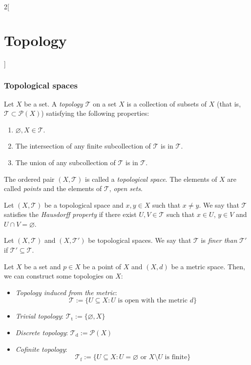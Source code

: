 \documentclass[../../../main.tex]{subfiles}
\begin{document}
\begin{multicols}{2}[\section{Topology}]
  \subsubsection*{Topological spaces}
  \begin{definition}
    Let $X$ be a set. A \textit{topology $\mathcal{T}$} on a set $X$ is a collection of subsets of $X$ (that is, $\mathcal{T}\subset\mathcal{P}(X)$) satisfying the following properties:
    \begin{enumerate}
      \item $\varnothing, X\in\mathcal{T}$.
      \item The intersection of any finite subcollection of $\mathcal{T}$ is in $\mathcal{T}$.
      \item The union of any subcollection of $\mathcal{T}$ is in $\mathcal{T}$.
    \end{enumerate}
    The ordered pair $(X,\mathcal{T})$ is called a \textit{topological space}. The elements of $X$ are called \textit{points} and the elements of $\mathcal{T}$, \textit{open sets}.
  \end{definition}
  \begin{definition}
    Let $(X,\mathcal{T})$ be a topological space and $x,y\in X$ such that $x\ne y$. We say that $\mathcal{T}$ satisfies the \textit{Hausdorff property} if there exist $U,V\in\mathcal{T}$ such that $x\in U$, $y\in V$ and $U\cap V=\varnothing$.
  \end{definition}
  \begin{definition}
    Let $(X,\mathcal{T})$ and $(X,\mathcal{T}')$ be topological spaces. We say that $\mathcal{T}$ is \textit{finer than} $\mathcal{T}'$ if $\mathcal{T}'\subseteq\mathcal{T}$.
  \end{definition}
  \begin{prop}
    Let $X$ be a set and $p\in X$ be a point of $X$ and $(X,d)$ be a metric space. Then, we can construct some topologies on $X$:
    \begin{itemize}
      \item \textit{Topology induced from the metric}: $$\mathcal{T}:=\{U\subseteq X:U\text{ is open with the metric }d\}$$
      \item \textit{Trivial topology}: $\mathcal{T}_\text{t}:=\{\varnothing,X\}$
      \item \textit{Discrete topology}: $\mathcal{T}_\text{d}:=\mathcal{P}(X)$
      \item \textit{Cofinite topology}: $$\mathcal{T}_\text{f}:=\{U\subseteq X:U=\varnothing\text{ or }X\setminus U\text{ is finite}\}$$

\end{itemize}
\end{prop}
\end{multicols}
\end{document}
